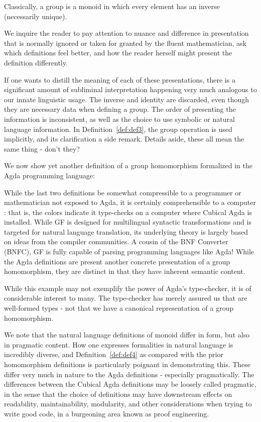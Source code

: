 
\begin{definition}\label{def:def4}
Classically, a group is a monoid in which every element has an inverse (necessarily unique).
\end{definition}

We inquire the reader to pay attention to nuance and difference in presentation
that is normally ignored or taken for granted by the fluent mathematician, ask
which definitions feel better, and how the reader herself might present the
definition differently.

If one wants to distill the meaning of each of these presentations, there is a
significant amount of subliminal interpretation happening very much analogous to
our innate linguistic usage. The inverse and identity are discarded, even though
they are necessary data when defining a group. The order of presenting the
information is inconsistent, as well as the choice to use symbolic or natural
language information. In Definition~\ref{def:def3}, the group operation is used
implicitly, and its clarification a side remark. Details aside, these all mean
the same thing - don't they?


We now show yet another definition of a group homomorphism formalized in the
Agda programming language:



While the last two definitions be somewhat compressible to a programmer
or mathematician not exposed to Agda, it is certainly comprehensible to a
computer : that is, the colors indicate it type-checks on a computer where Cubical Agda is installed.
While GF is designed for multilingual syntactic transformations and is targeted
for natural language translation, its underlying theory is largely based on
ideas from the compiler communities. A cousin of the BNF Converter (BNFC), GF is
fully capable of parsing programming languages like Agda! While the Agda
definitions are present another concrete presentation of a group
homomorphism, they are distinct in that they have inherent semantic content.

While this example may not exemplify the power of Agda's type-checker, it is of
considerable interest to many. The type-checker has merely assured us that
 are well-formed types - not that we have a canonical representation
of a group homomorphism.

We note that the natural
language definitions of monoid differ in form, but also in pragmatic content.
How one expresses formalities in natural language is incredibly diverse, and
Definition~\ref{def:def4} as compared with the prior homomorphism definitions is
particularly poignant in demonstrating this. These differ very much in nature to
the Agda definitions - especially pragmatically.
The differences between the Cubical
Agda definitions may be loosely called pragmatic, in the sense that the choice
of definitions may have downstream effects on readability, maintainability, modularity, and other
considerations when trying to write good code, in a burgeoning area known as proof engineering.

